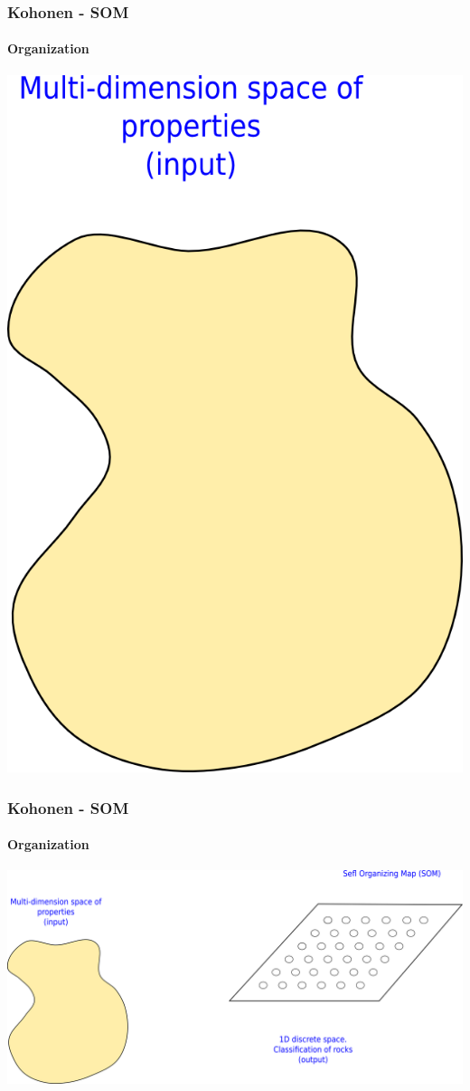 \documentclass[aspectratio=10]{beamer} %
\begin{document}
\begin{frame}
  \frametitle{Kohonen - SOM}
  \framesubtitle{Organization}
  	 \includegraphics[scale=0.5]{Imagens/Introkoho1.png} 
\end{frame}


\begin{frame}
  \frametitle{Kohonen - SOM}
  \framesubtitle{Organization}
 \includegraphics[scale=0.5]{Imagens/Introkoho2.png} 
\end{frame}
\end{document}
